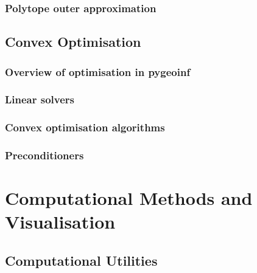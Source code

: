 \documentclass[11pt,twoside,openright]{book}
\theoremstyle{plain}
\theoremstyle{definition}
\theoremstyle{remark}
\begin{document}
\section{Polytope outer approximation}
\label{sec:polytope-approximation}


\chapter{Convex Optimisation}
\label{ch:convex-optimisation}

\section{Overview of optimisation in pygeoinf}
\label{sec:optim-overview}

\section{Linear solvers}
\label{sec:linear-solvers}

\section{Convex optimisation algorithms}
\label{sec:convex-algorithms}

\section{Preconditioners}
\label{sec:preconditioners}


\part{Computational Methods and Visualisation}
\label{part:computation}

\chapter{Computational Utilities}
\label{ch:computational}
\end{document}
